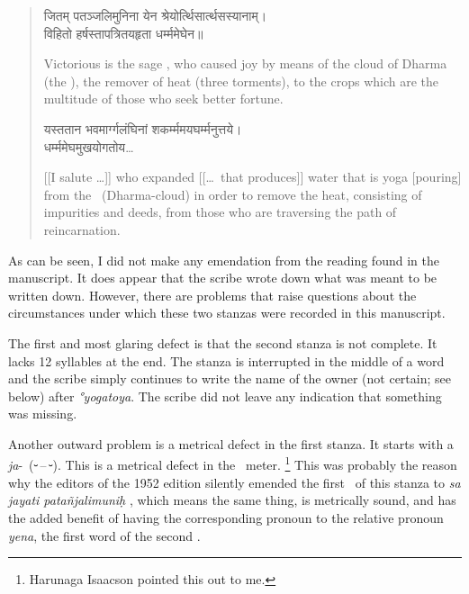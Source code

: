 \begin{verse}
{\dn जितम् पतञ्जलिमुनिना येन श्रेयोर्त्थिसार्त्थसस्यानाम्। \\
विहितो हर्षस्तापत्रितयहृता धर्म्ममेघेन॥}

Victorious is the sage \Patanjali, who caused joy by means of the cloud of Dharma (the \Dharmamegha [\samadhi]), the remover of heat (three torments), to the crops which are the multitude of those who seek better fortune.



{\dn यस्ततान भवमार्ग्गलंघिनां
\kle शकर्म्ममयघर्म्मनुत्तये। \\
धर्म्ममेघमुखयोगतोय\ldots}

[[I salute \Patanjali\ldots]] who expanded [[\ldots\ that produces]] water that is yoga [pouring] from the \Dharmamegha\ (Dharma-cloud) in order to remove the heat, consisting of impurities and deeds, from those who are traversing the path of reincarnation.
\end{verse}
As can be seen, I did not make any emendation from the reading found in the manuscript. It does appear that the scribe wrote down what was meant to be written down. However, there are problems that raise questions about the circumstances under which these two stanzas were recorded in this manuscript.

The first and most glaring defect is that the second stanza is not complete. It lacks 12 syllables at the end. The stanza is interrupted in the middle of a word and the scribe simply continues to write the name of the owner (not certain; see below) after \emph{°yogatoya}. The scribe did not leave any indication that something was missing.

Another outward problem is a metrical defect in the first stanza. It starts with a \emph{ja}-\gana\ ({\applesymbols ⏑\,–\,⏑}). This is a metrical defect in the \arya\ meter.%
\footnote{Harunaga Isaacson pointed this out to me.}
%
This was probably the reason why the editors of the 1952 edition silently emended the first \pada\ of this stanza to \emph{sa jayati patañjalimuniḥ} \citep[370]{yvi}, which means the same thing, is metrically sound, and has the added benefit of having the corresponding pronoun to the relative pronoun \emph{yena}, the first word of the second \pada. 

